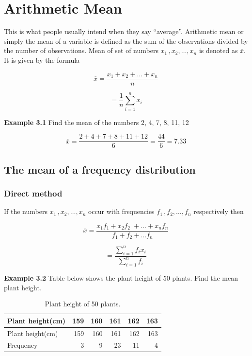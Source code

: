 \documentclass[
]{book}
\begin{document}
\section{Arithmetic Mean}\label{arithmetic-mean}

This is what people usually intend when they say ``average''. Arithmetic
mean or simply the mean of a variable is defined as the sum of the
observations divided by the number of observations. Mean of set of
numbers \(x_{1\ },x_{2},\ldots,x_{n}\) is denoted as \(\overline{x}\). It is
given by the formula

\[\overline{x} = \frac{x_{1} + x_{2} + \ldots + x_{n}}{n}\]

\[= \frac{1}{n}\sum_{i = 1}^{n}x_{i}\]

\textbf{Example 3.1} Find the mean of the numbers 2, 4, 7, 8, 11, 12

\[\overline{x} = \frac{2 + 4 + 7 + 8 + 11 + 12}{6} = \frac{44}{6} = 7.33\]

\subsection{The mean of a frequency distribution}\label{the-mean-of-a-frequency-distribution}

\subsubsection{Direct method}\label{direct-method}

If the numbers \(x_{1\ },x_{2},\ldots,x_{n}\) occur with frequencies
\(f_{1\ },f_{2},\ldots,f_{n}\) respectively then

\[\overline{x} = \frac{x_{1}f_{1} + x_{2}f_{2\ \ } + \ldots + x_{n}f_{n}}{f_{1} + f_{2} + \ldots f_{n}}\]

\[= \frac{\sum_{i = 1}^{n}{f_{i}x_{i}}}{\sum_{i = 1}^{n}f_{i}}\]

\textbf{Example 3.2} Table below shows the plant height of 50 plants. Find
the mean plant height.

\begin{longtable}[]{@{}lrrrrr@{}}
\caption{\label{tab:plantheight} Plant height of 50 plants.}\tabularnewline
\toprule\noalign{}
Plant height(cm) & 159 & 160 & 161 & 162 & 163 \\
\midrule\noalign{}
\endfirsthead
\toprule\noalign{}
Plant height(cm) & 159 & 160 & 161 & 162 & 163 \\
\midrule\noalign{}
\endhead
\bottomrule\noalign{}
\endlastfoot
Frequency & 3 & 9 & 23 & 11 & 4 \\
\end{longtable}
\end{document}
